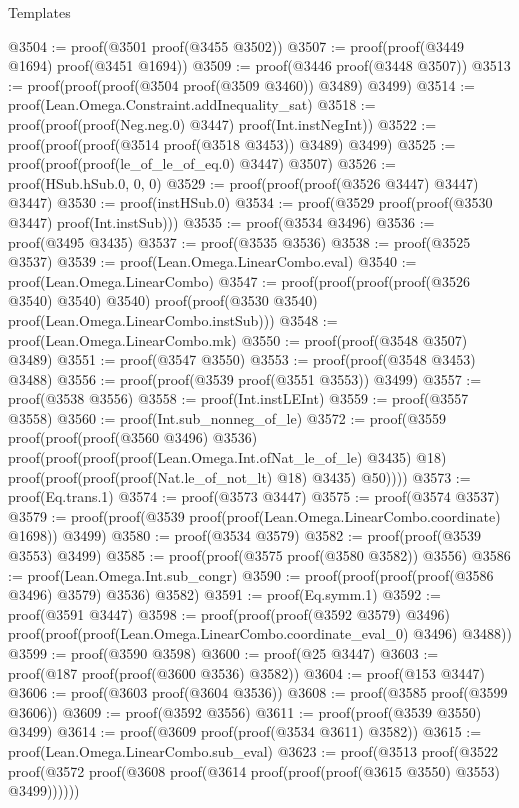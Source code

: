 \begin{lexlean}{Templates}
\begin{coremodule}
@3504 := proof(@3501 proof(@3455 @3502))
@3507 := proof(proof(@3449 @1694) proof(@3451 @1694))
@3509 := proof(@3446 proof(@3448 @3507))
@3513 := proof(proof(proof(@3504 proof(@3509 @3460)) @3489) @3499)
@3514 := proof(Lean.Omega.Constraint.addInequality_sat)
@3518 := proof(proof(proof(Neg.neg.{0}) @3447) proof(Int.instNegInt))
@3522 := proof(proof(proof(@3514 proof(@3518 @3453)) @3489) @3499)
@3525 := proof(proof(proof(le_of_le_of_eq.{0}) @3447) @3507)
@3526 := proof(HSub.hSub.{0, 0, 0})
@3529 := proof(proof(proof(@3526 @3447) @3447) @3447)
@3530 := proof(instHSub.{0})
@3534 := proof(@3529 proof(proof(@3530 @3447) proof(Int.instSub)))
@3535 := proof(@3534 @3496)
@3536 := proof(@3495 @3435)
@3537 := proof(@3535 @3536)
@3538 := proof(@3525 @3537)
@3539 := proof(Lean.Omega.LinearCombo.eval)
@3540 := proof(Lean.Omega.LinearCombo)
@3547 := proof(proof(proof(proof(@3526 @3540) @3540) @3540)
      proof(proof(@3530 @3540) proof(Lean.Omega.LinearCombo.instSub)))
@3548 := proof(Lean.Omega.LinearCombo.mk)
@3550 := proof(proof(@3548 @3507) @3489)
@3551 := proof(@3547 @3550)
@3553 := proof(proof(@3548 @3453) @3488)
@3556 := proof(proof(@3539 proof(@3551 @3553)) @3499)
@3557 := proof(@3538 @3556)
@3558 := proof(Int.instLEInt)
@3559 := proof(@3557 @3558)
@3560 := proof(Int.sub_nonneg_of_le)
@3572 := proof(@3559
      proof(proof(proof(@3560 @3496) @3536)
          proof(proof(proof(proof(Lean.Omega.Int.ofNat_le_of_le) @3435) @18)
              proof(proof(proof(proof(Nat.le_of_not_lt) @18) @3435) @50))))
@3573 := proof(Eq.trans.{1})
@3574 := proof(@3573 @3447)
@3575 := proof(@3574 @3537)
@3579 := proof(proof(@3539 proof(proof(Lean.Omega.LinearCombo.coordinate) @1698)) @3499)
@3580 := proof(@3534 @3579)
@3582 := proof(proof(@3539 @3553) @3499)
@3585 := proof(proof(@3575 proof(@3580 @3582)) @3556)
@3586 := proof(Lean.Omega.Int.sub_congr)
@3590 := proof(proof(proof(proof(@3586 @3496) @3579) @3536) @3582)
@3591 := proof(Eq.symm.{1})
@3592 := proof(@3591 @3447)
@3598 := proof(proof(proof(@3592 @3579) @3496)
      proof(proof(proof(Lean.Omega.LinearCombo.coordinate_eval_0) @3496) @3488))
@3599 := proof(@3590 @3598)
@3600 := proof(@25 @3447)
@3603 := proof(@187 proof(proof(@3600 @3536) @3582))
@3604 := proof(@153 @3447)
@3606 := proof(@3603 proof(@3604 @3536))
@3608 := proof(@3585 proof(@3599 @3606))
@3609 := proof(@3592 @3556)
@3611 := proof(proof(@3539 @3550) @3499)
@3614 := proof(@3609 proof(proof(@3534 @3611) @3582))
@3615 := proof(Lean.Omega.LinearCombo.sub_eval)
@3623 := proof(@3513
      proof(@3522
          proof(@3572 proof(@3608 proof(@3614 proof(proof(proof(@3615 @3550) @3553) @3499))))))

\end{coremodule}
\end{lexlean}
